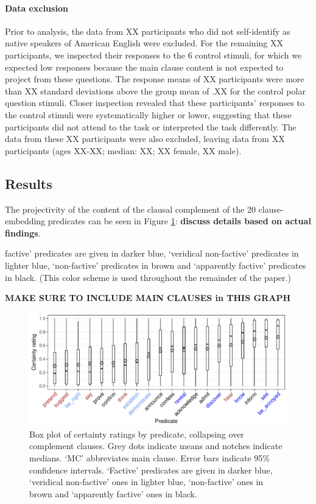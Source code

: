 \documentclass[11pt,fleqn]{article}
\newcommand{\6}{\mbox{$[\hspace*{-.6mm}[$}}
\newcommand{\9}{\mbox{$]\hspace*{-.6mm}]$}}
\begin{document}
\paragraph{Data exclusion}
Prior to analysis, the data from XX participants who did not self-identify as native speakers of American English were excluded. For the remaining XX participants, we inspected their responses to the 6 control stimuli, for which we expected low responses because the main clause content is not expected to project from these questions. The response means of XX participants were more than XX standard deviations above the group mean of .XX for the control polar question stimuli. Closer inspection revealed that these participants' responses to the control stimuli were systematically higher or lower, suggesting that these participants did not attend to the task or interpreted the task differently. The data from these XX participants were also excluded, leaving data from XX participants (ages XX-XX; median: XX; XX female, XX male).

\subsection{Results}

The projectivity of the content of the clausal complement of the 20 clause-embedding predicates can be seen in Figure \ref{f-projectivity}: {\bf discuss details based on actual findings}.

factive' predicates are given in darker blue, `veridical non-factive' predicates in lighter blue, `non-factive' predicates in brown and `apparently factive' predicates in black. (This color scheme is used throughout the remainder of the paper.)

{\bf MAKE SURE TO INCLUDE MAIN CLAUSES in THIS GRAPH}

\begin{figure}[H]
\centering

\includegraphics[width=.8\paperwidth]{../results/3-projectivity/graphs/boxplot-projectivity-factH}

\caption{Box plot of certainty ratings by predicate, collapsing over complement clauses. Grey dots indicate means and notches indicate medians. `MC' abbreviates main clause. Error bars indicate 95\% confidence intervals. `Factive' predicates are given in darker blue, `veridical non-factive' ones in lighter blue, `non-factive' ones in brown and `apparently factive' ones in black.}
\label{f-projectivity}
\end{figure}
\end{document}
